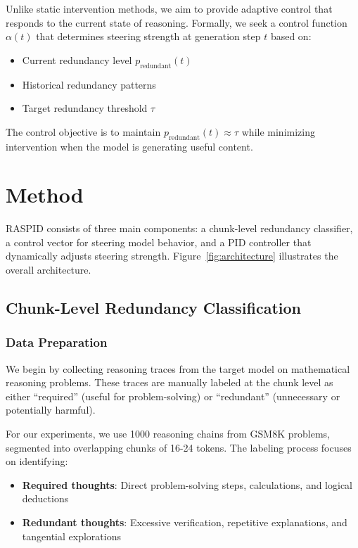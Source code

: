 \documentclass{article}
\begin{document}
Unlike static intervention methods, we aim to provide adaptive control that responds to the current state of reasoning. Formally, we seek a control function $\alpha(t)$ that determines steering strength at generation step $t$ based on:

\begin{itemize}
\item Current redundancy level $p_{\text{redundant}}(t)$
\item Historical redundancy patterns
\item Target redundancy threshold $\tau$
\end{itemize}

The control objective is to maintain $p_{\text{redundant}}(t) \approx \tau$ while minimizing intervention when the model is generating useful content.

\section{Method}

RASPID consists of three main components: a chunk-level redundancy classifier, a control vector for steering model behavior, and a PID controller that dynamically adjusts steering strength. Figure~\ref{fig:architecture} illustrates the overall architecture.

\subsection{Chunk-Level Redundancy Classification}

\subsubsection{Data Preparation}

We begin by collecting reasoning traces from the target model on mathematical reasoning problems. These traces are manually labeled at the chunk level as either ``required'' (useful for problem-solving) or ``redundant'' (unnecessary or potentially harmful).

For our experiments, we use 1000 reasoning chains from GSM8K problems, segmented into overlapping chunks of 16-24 tokens. The labeling process focuses on identifying:

\begin{itemize}
\item \textbf{Required thoughts}: Direct problem-solving steps, calculations, and logical deductions
\item \textbf{Redundant thoughts}: Excessive verification, repetitive explanations, and tangential explorations
\end{itemize}
\end{document}
